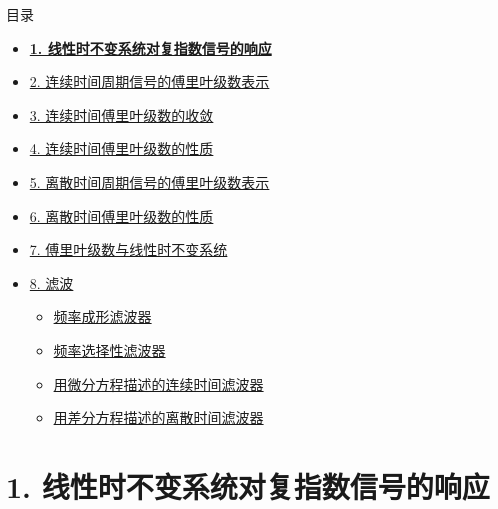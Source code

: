 \documentclass[
  ignorenonframetext,
]{beamer}
\providecommand{\tightlist}{%
  \setlength{\itemsep}{0pt}\setlength{\parskip}{0pt}}
\begin{document}
\begin{frame}{目录}
\protect{}\label{toc0}
\begin{itemize}
\tightlist
\item
  \hyperlink{sec31}{\textbf{1. 线性时不变系统对复指数信号的响应}}
\item
  \hyperlink{sec32}{2. 连续时间周期信号的傅里叶级数表示}
\item
  \hyperlink{sec33}{3. 连续时间傅里叶级数的收敛}
\item
  \hyperlink{sec34}{4. 连续时间傅里叶级数的性质}
\item
  \hyperlink{35}{5. 离散时间周期信号的傅里叶级数表示}
\item
  \hyperlink{sec36}{6. 离散时间傅里叶级数的性质}
\item
  \hyperlink{sec37}{7. 傅里叶级数与线性时不变系统}
\item
  \hyperlink{sec38}{8. 滤波}

  \begin{itemize}
  \tightlist
  \item
    \hyperlink{sec381}{频率成形滤波器}
  \item
    \hyperlink{sec382}{频率选择性滤波器}
  \item
    \hyperlink{sec383}{用微分方程描述的连续时间滤波器}
  \item
    \hyperlink{sec383}{用差分方程描述的离散时间滤波器}
  \end{itemize}
\end{itemize}
\end{frame}

\section{1. 线性时不变系统对复指数信号的响应}\label{sec31}
\end{document}
